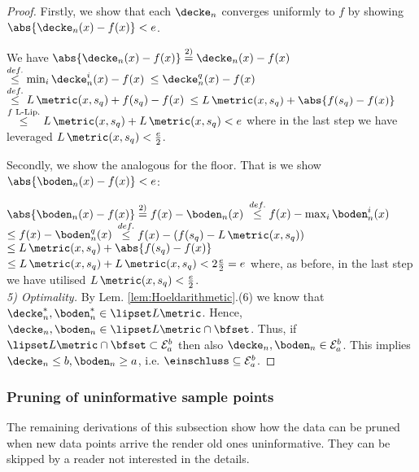 \begin{thm}
\begin{proof}
Firstly, we show that each $\decke_n$ converges uniformly to $ f$ by showing $\abs{\decke_n(x) - f(x) }< e$.

We have
$\abs{\decke_n(x) - f(x)} \stackrel{2)}{=} \decke_n(x) - f(x) $  
$\stackrel{def.}{\leq}\min_{i} \decke^i_n(x) - f(x) $
$\leq   \decke^q_n(x) - f(x) $
$\stackrel{def.}{\leq}  L \, \metric(x,s_q)+f(s_q) - f(x) $
$\leq  L \, \metric(x,s_q)+ \abs{f(s_q) - f(x) }$
$\stackrel{f \text{ L-Lip.}}{\leq}  L \, \metric(x,s_q)+   L \, \metric(x,s_q) <  e$ where in the last step we have leveraged $L \, \metric(x,s_q) < \frac{e}{2}$.

Secondly, we show the analogous for the floor. 
That is we show  $\abs{\boden_n(x) - f(x) }< e$:


$\abs{  \boden_n(x) - f(x)}\stackrel{2)}{=} f(x) - \boden_n(x) $  
$\stackrel{def.}{\leq} f(x) - \max_{i} \boden^i_n(x) $
$\leq   f(x)- \boden^q_n(x)  $
$\stackrel{def.}{\leq} f(x) - (f(s_q) -  L \, \metric(x,s_q))  $
$\leq  L \, \metric(x,s_q)+ \abs{f(s_q) - f(x) }$
$\leq  L \, \metric(x,s_q)+   L\, \metric(x,s_q) < 2 \frac{e}{2}= e$ where, as before, in the last step we have utilised $ L \, \metric(x,s_q) < \frac{e}{2}$.\\

\textit{5) Optimality.}  By Lem. \ref{lem:Hoeldarithmetic}.(6) we know that $\decke_n^*,\boden_n^* \in \lipset L \metric$. Hence, $\decke_n , \boden_n \in \lipset L \metric \cap \bfset$. 
Thus, if $\lipset L \metric \cap \bfset \subset \mathcal E^b_a $ then also $\decke_n, \boden_n \in \mathcal E^b_a$. This implies $\decke_n \leq b, \boden_n \geq a$, i.e. $\einschluss \subseteq \mathcal E^b_a$.
\end{proof} 
\end{thm}



\subsubsection{Pruning of uninformative sample points}

The remaining derivations of this subsection show how the data can be pruned when new data points arrive the render old ones uninformative. They can be skipped by a reader not interested in the details.


